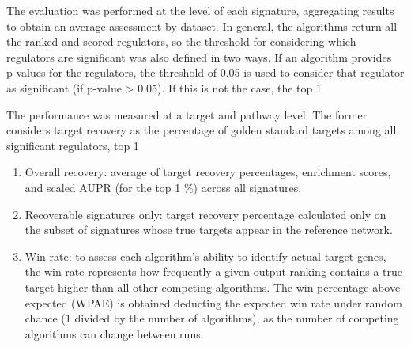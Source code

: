 The evaluation was performed at the level of each signature, aggregating results to obtain an average assessment by dataset. In general, the algorithms return all the ranked and scored regulators, so the threshold for considering which regulators are significant was also defined in two ways. If an algorithm provides p-values for the regulators, the threshold of 0.05 is used to consider that regulator as significant (if p-value > 0.05). If this is not the case, the top 1%

The performance was measured at a target and pathway level. The former considers target recovery as the percentage of golden standard targets among all significant regulators, top 1%

\begin{enumerate}
\item Overall recovery: average of target recovery percentages, enrichment scores, and scaled AUPR (for the top 1 \%) across all signatures.

\item Recoverable signatures only: target recovery percentage calculated only on the subset of signatures whose true targets appear in the reference network.

\item	Win rate: to assess each algorithm's ability to identify actual target genes, the win rate represents how frequently a given output ranking contains a true target higher than all other competing algorithms. The win percentage above expected (WPAE) is obtained deducting the expected win rate under random chance (1 divided by the number of algorithms), as the number of competing algorithms can change between runs. 
\end{enumerate}

